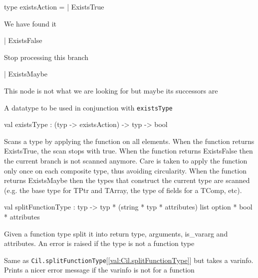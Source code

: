 \documentclass[11pt]{article}
\begin{document}
\label{type:Cil.existsAction}\begin{ocamldoccode}
type existsAction =
  | ExistsTrue
\end{ocamldoccode}
\begin{ocamldoccomment}
We have found it
\end{ocamldoccomment}
\begin{ocamldoccode}
  | ExistsFalse
\end{ocamldoccode}
\begin{ocamldoccomment}
Stop processing this branch
\end{ocamldoccomment}
\begin{ocamldoccode}
  | ExistsMaybe
\end{ocamldoccode}
\begin{ocamldoccomment}
This node is not what we are 
 looking for but maybe its 
 successors are
\end{ocamldoccomment}
\begin{ocamldocdescription}
A datatype to be used in conjunction with {\tt{existsType}}


\end{ocamldocdescription}




\label{val:Cil.existsType}\begin{ocamldoccode}
val existsType : (typ -> existsAction) -> typ -> bool
\end{ocamldoccode}
\begin{ocamldocdescription}
Scans a type by applying the function on all elements. 
    When the function returns ExistsTrue, the scan stops with
    true. When the function returns ExistsFalse then the current branch is not
    scanned anymore. Care is taken to 
    apply the function only once on each composite type, thus avoiding 
    circularity. When the function returns ExistsMaybe then the types that 
    construct the current type are scanned (e.g. the base type for TPtr and 
    TArray, the type of fields for a TComp, etc).


\end{ocamldocdescription}




\label{val:Cil.splitFunctionType}\begin{ocamldoccode}
val splitFunctionType :
  typ ->
  typ * (string * typ * attributes) list option * bool *
  attributes
\end{ocamldoccode}
\begin{ocamldocdescription}
Given a function type split it into return type, 
 arguments, is\_vararg and attributes. An error is raised if the type is not 
 a function type

Same as {\tt{Cil.splitFunctionType}}[\ref{val:Cil.splitFunctionType}] but takes a varinfo. Prints a nicer 
 error message if the varinfo is not for a function


\end{ocamldocdescription}
\end{document}

